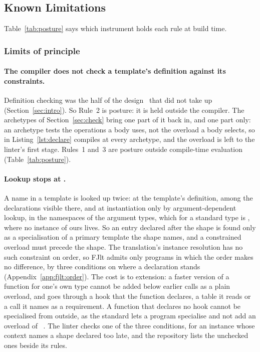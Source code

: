 \subsection{Known Limitations}
\label{sec:limits}

Table~\ref{tab:posture} says which instrument holds each rule at build time.

\subsubsection*{Limits of principle}

\paragraph{The compiler does not check a template's definition against its constraints.}
Definition checking was the half of the  design~\cite{gregor2006concepts} that  did not take up (Section~\ref{sec:intro}).
So Rule~2 is posture: it is held outside the compiler.
The archetypes of Section~\ref{sec:check} bring one part of it back in, and one part only: an archetype tests the operations a body uses, not the overload a body selects, so  in Listing~\ref{lst:declare} compiles at every archetype, and the overload is left to the linter's first stage.
Rules~1 and~3 are posture outside compile-time evaluation (Table~\ref{tab:posture}).

\paragraph{Lookup stops at .}
A name in a template is looked up twice: at the template's definition, among the declarations visible there, and at instantiation only by argument-dependent lookup, in the namespaces of the argument types, which for a standard type is , where no instance of ours lives.
So an entry declared after the shape is found only as a specialisation of a primary template the shape names, and a constrained overload must precede the shape.
The translation's instance resolution has no such constraint on order, so FJlt admits only programs in which the order makes no difference, by three conditions on where a declaration stands (Appendix~\ref{app:fjlt:order}).
The cost is to extension: a faster version of a function for one's own type cannot be added below earlier calls as a plain overload, and goes through a hook that the function declares, a table it reads or a call it names as a requirement.
A function that declares no hook cannot be specialised from outside, as the standard lets a program specialise  and not add an overload of ~\cite[{\texttt{namespace.std}}]{cpp23standard}.
The linter checks one of the three conditions, for an instance whose context names a shape declared too late, and the repository lists the unchecked ones beside its rules.


